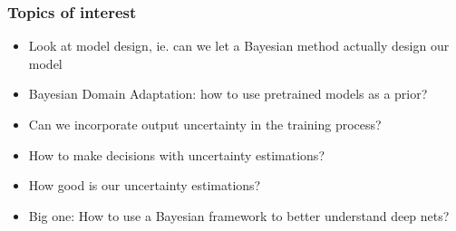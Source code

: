\documentclass{beamer}
\begin{document}


\begin{frame}
  \frametitle{Topics of interest}
  \begin{itemize}
  \item Look at model design, ie. can we let a Bayesian method actually design our model
  \item Bayesian Domain Adaptation: how to use pretrained models as a prior?
  \item Can we incorporate output uncertainty in the training process?
  \item How to make decisions with uncertainty estimations?
  \item How good is our uncertainty estimations?
  \item Big one: How to use a Bayesian framework to better understand deep nets?
  \end{itemize}

\end{frame}
% 
% 
% 
% 

\end{document}
